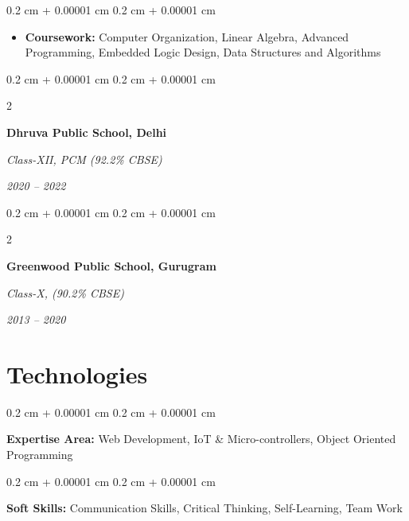 \documentclass[10pt, letterpaper]{article}
\newenvironment{highlights}{
    \begin{itemize}[
        topsep=0.10 cm,
        parsep=0.10 cm,
        partopsep=0pt,
        itemsep=0pt,
        leftmargin=0.4 cm + 10pt
    ]
}{
    \end{itemize}
} %
\newenvironment{onecolentry}{
    \begin{adjustwidth}{
        0.2 cm + 0.00001 cm
    }{
        0.2 cm + 0.00001 cm
    }
}{
    \end{adjustwidth}
} %
\newenvironment{twocolentry}[2][]{
    \onecolentry
    \def\secondColumn{#2}
    \setcolumnwidth{\fill, 4.5 cm}
    \begin{paracol}{2}
}{
    \switchcolumn \raggedleft \secondColumn
    \end{paracol}
    \endonecolentry
} %
\begin{document}
        \vspace{0.10 cm}
        \begin{onecolentry}
            \begin{highlights}
                \item \textbf{Coursework:} Computer Organization, Linear Algebra, Advanced Programming, Embedded Logic Design, Data Structures and Algorithms
            \end{highlights}
        \end{onecolentry}

        \vspace{0.2 cm}

        \begin{twocolentry}{


            
        \textit{2020 – 2022}}
            \textbf{Dhruva Public School, Delhi}

            \textit{Class-XII, PCM (92.2\% CBSE)}
        \end{twocolentry}

        \vspace{0.2 cm}

        \begin{twocolentry}{


            
        \textit{2013 – 2020}}
            \textbf{Greenwood Public School, Gurugram}

            \textit{Class-X, (90.2\% CBSE)}
        \end{twocolentry}

        \vspace{0.10 cm}
        

    \section{Technologies}

        \begin{onecolentry}
            \textbf{Expertise Area:} Web Development, IoT \& Micro-controllers, Object Oriented Programming
        \end{onecolentry}

        \vspace{0.2 cm}

        \begin{onecolentry}
            \textbf{Soft Skills:} Communication Skills, Critical Thinking, Self-Learning, Team Work
        \end{onecolentry}
\end{document}
